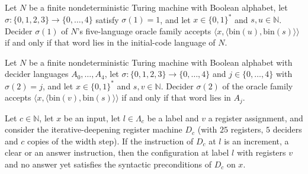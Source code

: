 \begin{theorem}
\label{Complexity.LogProg.SavitchARM.dp_initO}
\leanok
{}
Let $N$ be a finite nondeterministic Turing machine with Boolean alphabet, let
$\sigma:\{0,1,2,3\}\to\{0,\dots,4\}$ satisfy $\sigma(1)=1$, and let $x\in\{0,1\}^*$ and
$s,u\in\mathbb{N}$. Decider $\sigma(1)$ of $N$'s five-language oracle family accepts
$\langle x,\langle\mathrm{bin}(u),\mathrm{bin}(s)\rangle\rangle$ if and only if that word lies in the
initial-code language of $N$.
\end{theorem}

\begin{theorem}
\label{Complexity.LogProg.SavitchARM.dp_accO}
\leanok
{}
Let $N$ be a finite nondeterministic Turing machine with Boolean alphabet with decider languages
$A_0,\dots,A_4$, let $\sigma:\{0,1,2,3\}\to\{0,\dots,4\}$ and $j\in\{0,\dots,4\}$ with
$\sigma(2)=j$, and let $x\in\{0,1\}^*$ and $s,v\in\mathbb{N}$. Decider $\sigma(2)$ of the oracle
family accepts $\langle x,\langle\mathrm{bin}(v),\mathrm{bin}(s)\rangle\rangle$ if and only if that
word lies in $A_j$.
\end{theorem}

\begin{theorem}
\label{Complexity.LogProg.SavitchARM.dp_pre}
\leanok
{}
Let $c\in\mathbb{N}$, let $x$ be an input, let $l\in\Lambda_c$ be a label and $v$ a register
assignment, and consider the iterative-deepening register machine $D_c$ (with $25$ registers, $5$ deciders and $c$ copies of the width step). If the instruction of $D_c$ at $l$ is an increment, a clear or an
answer instruction, then the configuration at label $l$ with registers $v$ and no answer yet
satisfies the syntactic preconditions of $D_c$ on $x$.
\end{theorem}

